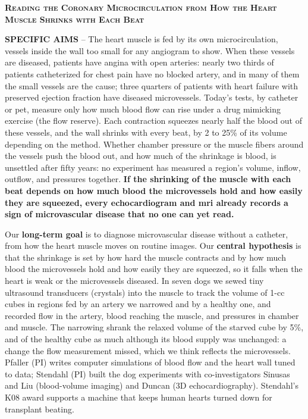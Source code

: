 \documentclass[11pt]{article}
\begin{document}
\centerline{\textbf{\textsc{Reading the Coronary Microcirculation from How the Heart Muscle Shrinks with Each Beat}}}

\textbf{SPECIFIC AIMS} -- The heart muscle is fed by its own microcirculation, vessels inside the wall too small for any angiogram to show. When these vessels are diseased, patients have angina with open arteries: nearly two thirds of patients catheterized for chest pain have no blocked artery, and in many of them the small vessels are the cause; three quarters of patients with heart failure with preserved ejection fraction have diseased microvessels.\cite{kunadian20,delbuono21,patel10,shah18} Today's tests, by catheter or \gls*{pet}, measure only how much blood flow can rise under a drug mimicking exercise (the flow reserve).\cite{kunadian20,vink21} Each contraction squeezes nearly half the blood out of these vessels, and the wall shrinks with every beat, by 2 to 25\% of its volume depending on the method.\cite{judd91,ashikaga08,brown25} Whether chamber pressure or the muscle fibers around the vessels push the blood out, and how much of the shrinkage is blood, is unsettled after fifty years:\cite{westerhof06} no experiment has measured a region's volume, inflow, outflow, and pressures together. \textbf{If the shrinking of the muscle with each beat depends on how much blood the microvessels hold and how easily they are squeezed, every echocardiogram and \gls*{mri} already records a sign of microvascular disease that no one can yet read.}

Our \textbf{long-term goal} is to diagnose microvascular disease without a catheter, from how the heart muscle moves on routine images. Our \textbf{central hypothesis} is that the shrinkage is set by how hard the muscle contracts and by how much blood the microvessels hold and how easily they are squeezed, so it falls when the heart is weak or the microvessels diseased. In seven dogs we sewed tiny ultrasound transducers (crystals) into the muscle to track the volume of 1-cc cubes in regions fed by an artery we narrowed and by a healthy one, and recorded flow in the artery, blood reaching the muscle, and pressures in chamber and muscle.\cite{stendahl23} The narrowing shrank the relaxed volume of the starved cube by 5\%, and of the healthy cube as much although its blood supply was unchanged: a change the flow measurement missed, which we think reflects the microvessels. Pfaller (PI) writes computer simulations of blood flow and the heart wall tuned to data;\cite{pfaller24,richter25} Stendahl (PI) built the dog experiments with co-investigators Sinusas and Liu (blood-volume imaging)\cite{mohyuddin18,yousefi23} and Duncan (3D echocardiography).\cite{ta24} Stendahl's K08 award supports a machine that keeps human hearts turned down for transplant beating.
\end{document}
